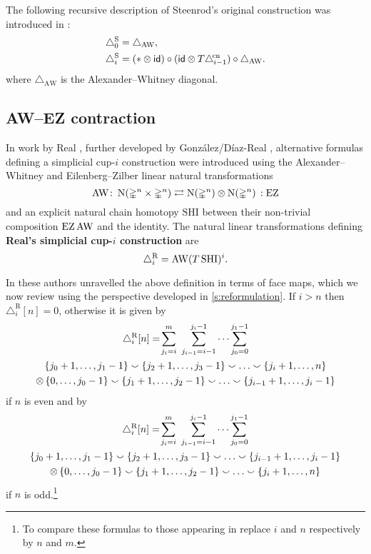 \begin{remark*}
	The following recursive description of Steenrod's original construction was introduced in \cite{medina2023dennis}:
	\begin{equation}\label{eq:prop cup-i}
		\begin{split}
			& \triangle^{\mathrm{S}}_0 = \triangle_{\text{AW}}, \\
			& \triangle^{\mathrm{S}}_i =
			(\ast \otimes \mathsf{id}) \circ (\mathsf{id} \otimes T \triangle^{\!\mathrm{cn}}_{i-1}) \circ \triangle_{\text{AW}}.
		\end{split}
	\end{equation}
	where $\triangle_{\text{AW}}$ is the Alexander--Whitney diagonal.
\end{remark*}

\subsection{AW--EZ contraction}\label{ss:real}

In work by Real \cite{real1996computability}, further developed by Gonz\'alez\-/D\'iaz\--Real \cite{gonzalez-diaz1999steenrod, gonzalez2003computation, gonzalez-diaz2005cocyclic}, alternative formulas defining a simplicial \mbox{cup-$i$} construction were introduced using the Alexander--Whitney and Eilenberg--Zilber linear natural transformations
\[
\operatorname{AW} \colon \operatorname{N}(\mathbb{\Delta}^n \times \mathbb{\Delta}^n)
\rightleftarrows
\operatorname{N}(\mathbb{\Delta}^n) \otimes \operatorname{N}(\mathbb{\Delta}^n) \,: \operatorname{EZ}
\]
and an explicit natural chain homotopy $\mathrm{SHI}$ between their non-trivial composition $\operatorname{EZ} \operatorname{AW}$ and the identity.
The natural linear transformations defining \textbf{Real's simplicial \mbox{cup-$i$} construction} are
\[
\triangle^{\mathrm{R}}_i = \operatorname{AW} (T \, \mathrm{SHI})^i.
\]

In \cite[Theorem~3.1]{gonzalez-diaz1999steenrod} these authors unravelled the above definition in terms of face maps, which we now review using the perspective developed in \cref{s:reformulation}.
If $i > n$ then $\triangle_i^{\mathrm{R}} [n] = 0$, otherwise it is given by
\begin{multline}\label{eq:real left}
	\triangle^{\mathrm{R}}_i [n] = \!
	\sum_{j_i=i}^{m} \ \sum_{j_{i-1}=i-1}^{j_i-1} \dots \sum_{j_0=0}^{j_1-1} \\
	\{j_0+1,\dots,j_1-1\} \union \{j_2+1,\dots,j_3-1\} \union \dots \union \{j_i+1,\dots,n\} \\ \ot \,
	\{0,\dots,j_0-1\} \union \{j_1+1,\dots,j_2-1\} \union \dots \union \{j_{i-1}+1,\dots,j_i-1\}
\end{multline}
if $n$ is even and by
\begin{multline}\label{eq:real right}
	\triangle^\rR_i [n] = \!
	\sum_{j_i=i}^{m} \ \sum_{j_{i-1}=i-1}^{j_i-1} \dots \sum_{j_0=0}^{j_1-1} \\
	\{j_0+1,\dots,j_1-1\} \union \{j_2+1,\dots,j_3-1\} \union \dots \union \{j_{i-1}+1,\dots,j_i-1\} \\ \ot \,
	\{0,\dots,j_0-1\} \union \{j_1+1,\dots,j_2-1\} \union \dots \union \{j_i+1,\dots,n\}
\end{multline}
if $n$ is odd.\footnote{To compare these formulas to those appearing in \cite[Theorem~3.1]{gonzalez-diaz1999steenrod} replace $i$ and $n$ respectively by $n$ and $m$.}

